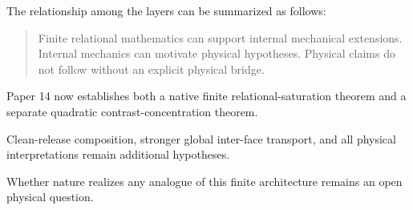 The relationship among the layers can be summarized as follows:

\begin{quote}
Finite relational mathematics can support internal mechanical
extensions.  Internal mechanics can motivate physical hypotheses.
Physical claims do not follow without an explicit physical bridge.
\end{quote}

Paper 14 now establishes both a native finite relational-saturation
theorem and a separate quadratic contrast-concentration theorem.

Clean-release composition, stronger global inter-face transport, and
all physical interpretations remain additional hypotheses.

Whether nature realizes any analogue of this finite architecture
remains an open physical question.
